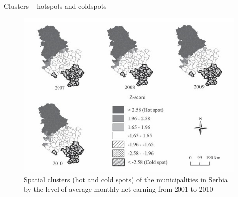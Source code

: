 \documentclass{beamer}
\begin{document}
\begin{frame}{Clusters -- hotspots and coldspots}
\begin{figure}
	\includegraphics[width=.7\textwidth]{IMG/sp_coldspot.PNG}
	\caption{Spatial clusters (hot and cold spots) of the municipalities in Serbia by the level of average monthly net earning from 2001 to 2010}
\end{figure}
\end{frame}
\end{document}
